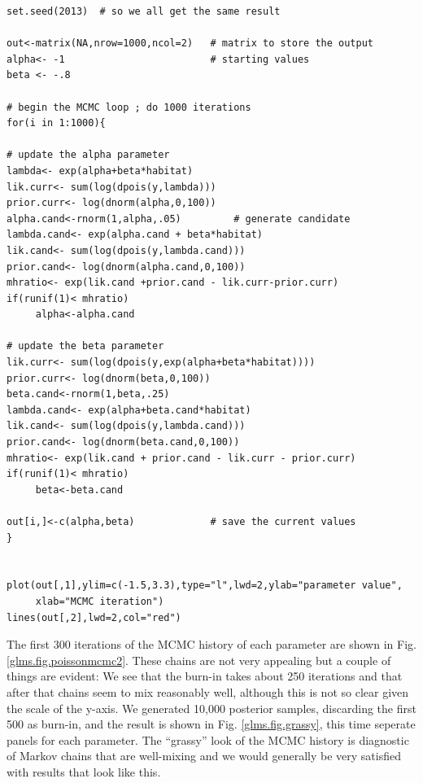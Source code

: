 {\small
\begin{verbatim}
set.seed(2013)  # so we all get the same result

out<-matrix(NA,nrow=1000,ncol=2)   # matrix to store the output
alpha<- -1                         # starting values
beta <- -.8

# begin the MCMC loop ; do 1000 iterations
for(i in 1:1000){

# update the alpha parameter
lambda<- exp(alpha+beta*habitat)
lik.curr<- sum(log(dpois(y,lambda)))
prior.curr<- log(dnorm(alpha,0,100))
alpha.cand<-rnorm(1,alpha,.05)         # generate candidate
lambda.cand<- exp(alpha.cand + beta*habitat)
lik.cand<- sum(log(dpois(y,lambda.cand)))
prior.cand<- log(dnorm(alpha.cand,0,100))
mhratio<- exp(lik.cand +prior.cand - lik.curr-prior.curr)
if(runif(1)< mhratio)
     alpha<-alpha.cand

# update the beta parameter
lik.curr<- sum(log(dpois(y,exp(alpha+beta*habitat))))
prior.curr<- log(dnorm(beta,0,100))
beta.cand<-rnorm(1,beta,.25)
lambda.cand<- exp(alpha+beta.cand*habitat)
lik.cand<- sum(log(dpois(y,lambda.cand)))
prior.cand<- log(dnorm(beta.cand,0,100))
mhratio<- exp(lik.cand + prior.cand - lik.curr - prior.curr)
if(runif(1)< mhratio)
     beta<-beta.cand

out[i,]<-c(alpha,beta)             # save the current values
}


plot(out[,1],ylim=c(-1.5,3.3),type="l",lwd=2,ylab="parameter value",
     xlab="MCMC iteration")
lines(out[,2],lwd=2,col="red")
\end{verbatim}
}

The first 300 iterations of the MCMC history of each parameter
are shown in Fig. \ref{glms.fig.poissonmcmc2}. These chains are
not very appealing but a couple of things are evident: 
We see
that the burn-in takes about 250 iterations and that after that chains seem to mix 
reasonably well, although this is not so clear given the scale of the y-axis.
We generated 10,000 posterior samples,
discarding the first 500 as burn-in, and the result is shown in
Fig. \ref{glms.fig.grassy}, this time seperate panels for each
parameter.
The ``grassy''
look of the MCMC history is diagnostic of Markov chains that are
well-mixing and we would generally be very satisfied with results that
look like this.

